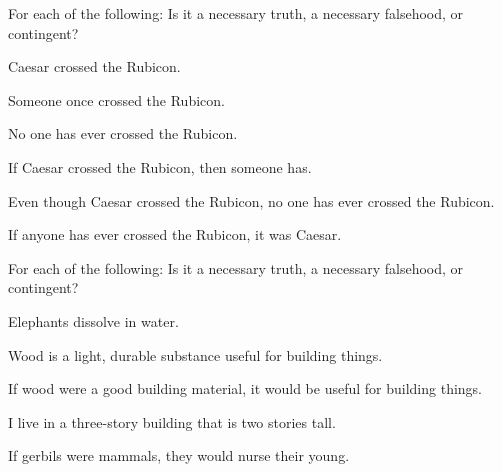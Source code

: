 
\practiceproblems
\problempart
\label{pr.EnglishTautology2}
For each of the following: Is it a necessary truth, a necessary falsehood, or contingent?
\begin{compactlist}
\item Caesar crossed the Rubicon.
\item Someone once crossed the Rubicon.
\item No one has ever crossed the Rubicon.
\item If Caesar crossed the Rubicon, then someone has.
\item Even though Caesar crossed the Rubicon, no one has ever crossed the Rubicon.
\item If anyone has ever crossed the Rubicon, it was Caesar.
\end{compactlist}

\problempart
For each of the following: Is it a necessary truth, a necessary falsehood, or contingent?
\begin{compactlist}
\item Elephants dissolve in water.
\item Wood is a light, durable substance useful for building things.
\item If wood were a good building material, it would be useful for building things.
\item I live in a three-story building that is two stories tall.
\item If gerbils were mammals, they would nurse their young.
\end{compactlist}

